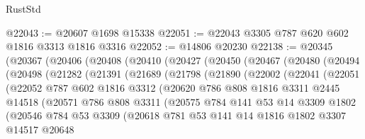 \begin{lexlean}{RustStd}
\begin{coremodule}
@22043 := @20607 @1698 @15338
@22051 := @22043 @3305 @787 @620 @602 @1816 @3313 @1816 @3316
@22052 := @14806 @20230
@22138 := @20345
    (@20367
      (@20406
        (@20408
          (@20410
            (@20427
              (@20450
                (@20467
                  (@20480
                    (@20494
                      (@20498
                        (@21282
                          (@21391
                            (@21689
                              (@21798
                                (@21890
                                  (@22002
                                    (@22041
                                      (@22051
                                        (@22052
                                          @787
                                          @602
                                          @1816
                                          @3312
                                          (@20620
                                            @786
                                            @808
                                            @1816
                                            @3311
                                            @2445
                                            @14518
                                            (@20571
                                              @786
                                              @808
                                              @3311
                                              (@20575
                                                @784
                                                @141
                                                @53
                                                @14
                                                @3309
                                                @1802
                                                (@20546
                                                  @784
                                                  @53
                                                  @3309
                                                  (@20618
                                                    @781
                                                    @53
                                                    @141
                                                    @14
                                                    @1816
                                                    @1802
                                                    @3307
                                                    @14517
                                                    @20648

\end{coremodule}
\end{lexlean}
